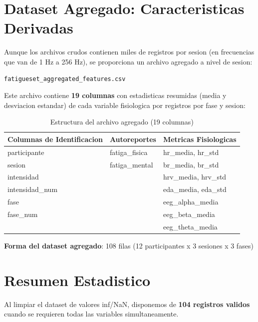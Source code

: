 \section{Dataset Agregado: Caracteristicas Derivadas}

Aunque los archivos crudos contienen miles de registros por sesion (en frecuencias
que van de 1 Hz a 256 Hz), se proporciona un archivo agregado a nivel de sesion:

\begin{verbatim}
fatigueset_aggregated_features.csv
\end{verbatim}

Este archivo contiene \textbf{19 columnas} con estadisticas resumidas (media y desviacion
estandar) de cada variable fisiologica por registros por fase y sesion:

\begin{table}[H]
\centering
\caption{Estructura del archivo agregado (19 columnas)}
\begin{tabular}{|l|l|l|}
\hline
\textbf{Columnas de Identificacion} & \textbf{Autoreportes} & \textbf{Metricas Fisiologicas} \\
\hline
participante & fatiga\_fisica & hr\_media, hr\_std \\
sesion & fatiga\_mental & br\_media, br\_std \\
intensidad & & hrv\_media, hrv\_std \\
intensidad\_num & & eda\_media, eda\_std \\
fase & & eeg\_alpha\_media \\
fase\_num & & eeg\_beta\_media \\
& & eeg\_theta\_media \\
\hline
\end{tabular}
\end{table}

\textbf{Forma del dataset agregado}: 108 filas (12 participantes x 3 sesiones x 3 fases)

\section{Resumen Estadistico}

Al limpiar el dataset de valores inf/NaN, disponemos de \textbf{104 registros validos}
cuando se requieren todas las variables simultaneamente.

